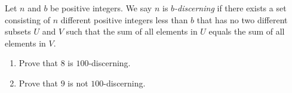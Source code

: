 Let $n$ and $b$ be positive integers. We say $n$ is \emph{$b$-discerning} if there exists a set consisting of $n$ different positive integers less than $b$ that has no two different subsets $U$ and $V$ such that the sum of all elements in $U$ equals the sum of all elements in $V$.
\begin{enumerate}[label=(\alph*)]
	\item Prove that $8$ is $100$-discerning.
	\item Prove that $9$ is not $100$-discerning.
\end{enumerate}